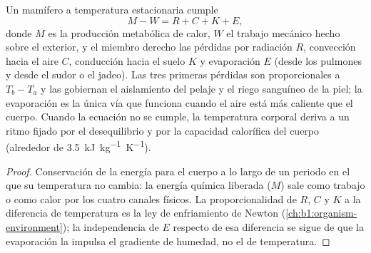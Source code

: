 \begin{proposition}\label{prop:b1:mammal-organization:heatbudget}
Un mamífero a temperatura estacionaria cumple
\[
M - W = R + C + K + E ,
\]
donde $M$ es la producción metabólica de calor, $W$ el trabajo mecánico
hecho sobre el exterior, y el miembro derecho las pérdidas por radiación
$R$, convección hacia el aire $C$, conducción hacia el suelo $K$ y
evaporación $E$ (desde los pulmones y desde el sudor o el jadeo). Las tres
primeras pérdidas son proporcionales a $T_b - T_a$ y las gobiernan el
aislamiento del pelaje y el riego sanguíneo de la piel; la evaporación es la
única vía que funciona cuando el aire está más caliente que el cuerpo.
Cuando la ecuación no se cumple, la temperatura corporal deriva a un ritmo
fijado por el desequilibrio y por la capacidad calorífica del cuerpo
(alrededor de \qty{3.5}{kJ.kg^{-1}.K^{-1}}).
\end{proposition}
\begin{proof}
Conservación de la energía para el cuerpo a lo largo de un periodo en el que
su temperatura no cambia: la energía química liberada ($M$) sale como
trabajo o como calor por los cuatro canales físicos. La proporcionalidad de
$R$, $C$ y $K$ a la diferencia de temperatura es la ley de enfriamiento de
Newton (\cref{ch:b1:organism-environment}); la independencia de $E$ respecto
de esa diferencia se sigue de que la evaporación la impulsa el gradiente de
humedad, no el de temperatura.
\end{proof}

